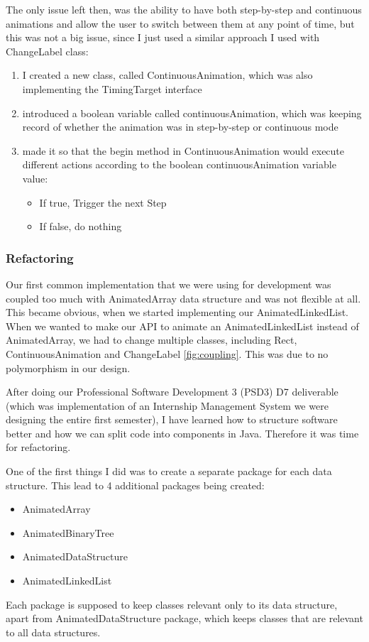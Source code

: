 \documentclass{l3proj}
\begin{document}
The only issue left then, was the ability to have both step-by-step and continuous animations and allow the user to switch between them at any point of time, but this was not a big issue, since I just used a similar approach I used with ChangeLabel class:
\begin{enumerate}
	\item I created a new class, called ContinuousAnimation, which was also implementing the TimingTarget interface
	\item introduced a boolean variable called continuousAnimation, which was keeping record of whether the animation was in step-by-step or continuous mode
	\item made it so that the begin method in ContinuousAnimation would execute different actions according to the boolean continuousAnimation variable value:
	\begin{itemize}
		\item If true, Trigger the next Step
		\item If false, do nothing
	\end{itemize}
\end{enumerate}

\subsubsection{Refactoring}

Our first common implementation that we were using for development was coupled too much with AnimatedArray data structure and was not flexible at all. This became obvious, when we started implementing our AnimatedLinkedList. When we wanted to make our API to animate an AnimatedLinkedList instead of AnimatedArray, we had to change multiple classes, including Rect, ContinuousAnimation and ChangeLabel \ref{fig:coupling}. This was due to no polymorphism in our design.



After doing our Professional Software Development 3 (PSD3) D7 deliverable (which was implementation of an Internship Management System we were designing the entire first semester), I have learned how to structure software better and how we can split code into components in Java. Therefore it was time for refactoring.

One of the first things I did was to create a separate package for each data structure. This lead to 4 additional packages being created:
\begin{itemize} 
	\item AnimatedArray
	\item AnimatedBinaryTree
	\item AnimatedDataStructure
	\item AnimatedLinkedList
\end{itemize}
Each package is supposed to keep classes relevant only to its data structure, apart from AnimatedDataStructure package, which keeps classes that are relevant to all data structures.
\end{document}
